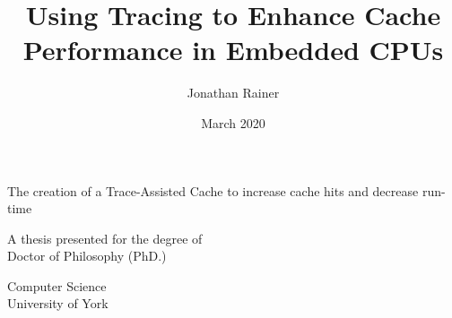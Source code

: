 \title{Using Tracing to Enhance Cache Performance in Embedded CPUs}
\author{Jonathan Rainer}
\date{March 2020}

\begin{titlepage}
    \begin{center}
        \vspace*{1cm}
 
        \Huge
        \textbf{\thetitle}
 
        \vspace{0.5cm}
        \LARGE
        The creation of a Trace-Assisted Cache to increase cache hits and decrease run-time
 
        \vspace{1.5cm}
 
        \textbf{\theauthor}
 
        \vfill
 
 		\vspace{1cm}
 
        A thesis presented for the degree of\\
        Doctor of Philosophy (PhD.)
        
        \vspace{1cm}
 
        \Large
        Computer Science\\
        University of York\\
        \thedate
 
    \end{center}
\end{titlepage}